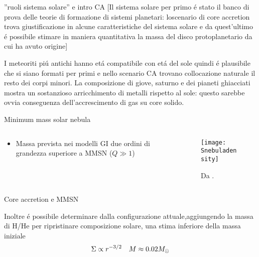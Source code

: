 \begin{wordonframe}{''ruoli sistema solare'' e intro CA}
[Il sistema solare per primo \'e stato il banco di prova delle teorie di formazione di sistemi planetari: loscenario di core accretion trova giustificazione in alcune caratteristiche del sistema solare e da quest'ultimo \'e possibile stimare in maniera quantitativa la massa del disco protoplanetario da cui ha avuto origine]

I meteoriti pi\'u antichi hanno et\'a compatibile con et\'a del sole quindi \'e plausibile che si siano formati per primi e nello scenario CA trovano collocazione naturale il resto dei corpi minori.
La composizione di giove, saturno e dei pianeti ghiacciati mostra un sostanzioso arricchimento di metalli rispetto al sole: questo sarebbe ovvia conseguenza dell'accrescimento di gas su core solido.

\end{wordonframe}

\begin{frame}{Minimum mass solar nebula}
\begin{columns}[T]
	\begin{column}{0.45\textwidth}
\begin{itemize}
	\item Massa prevista nei modelli GI due ordini di grandezza superiore a MMSN ($Q\gg1$)
\end{itemize}
	\end{column}
	\begin{column}{0.54\textwidth}
			\begin{figure}[!ht]
			\texttt{[image: Snebuladensity]}
			\caption{Da \cite{weidenschilling1977distribution}.}\label{fig:Snebuladensity}
		\end{figure}
	\end{column}
\end{columns}
\end{frame}

\begin{wordonframe}{Core accretion e MMSN}

Inoltre \'e possibile determinare dalla configurazione attuale,aggiungendo la massa di H/He per ripristinare composizione solare, una stima inferiore della massa iniziale 
\begin{align*}
&\Sigma\propto r^{-3/2}
&M\approx0.02M_{\odot}{}
\end{align*}

\end{wordonframe}
